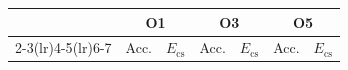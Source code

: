 \begin{tabular}{@{}lcccccc@{}}
\toprule
 & \multicolumn{2}{c}{O1} & \multicolumn{2}{c}{O3} & \multicolumn{2}{c}{O5} \\
\cmidrule(lr){2-3}\cmidrule(lr){4-5}\cmidrule(lr){6-7}
 & Acc. & $E_{\mathrm{cs}}$ & Acc. & $E_{\mathrm{cs}}$ & Acc. & $E_{\mathrm{cs}}$ \\
\midrule
\bottomrule
\end{tabular}
